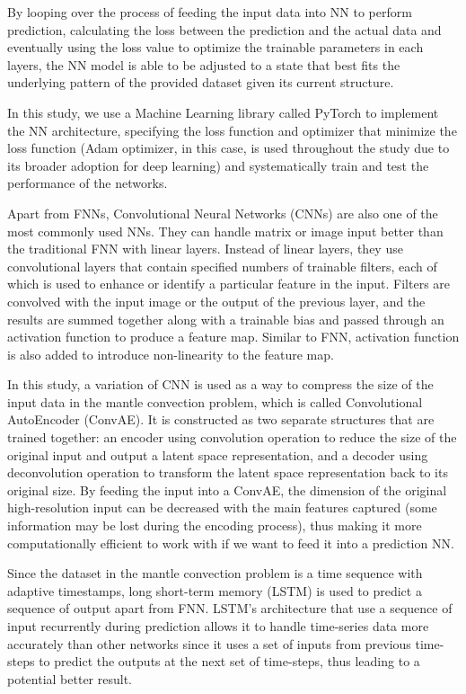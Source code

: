 By looping over the process of feeding the input data into NN to perform prediction, calculating the loss between the prediction and the actual data and eventually using the loss value to optimize the trainable parameters in each layers, the NN model is able to be adjusted to a state that best fits the underlying pattern of the provided dataset given its current structure.

In this study, we use a Machine Learning library called PyTorch to implement the NN architecture, specifying the loss function and optimizer that minimize the loss function (Adam optimizer, in this case, is used throughout the study due to its broader adoption for deep learning) and systematically train and test the performance of the networks.

Apart from FNNs, Convolutional Neural Networks (CNNs) are also one of the most commonly used NNs. They can handle matrix or image input better than the traditional FNN with linear layers. Instead of linear layers, they use convolutional layers that contain specified numbers of trainable filters, each of which is used to enhance or identify a particular feature in the input. Filters are convolved with the input image or the output of the previous layer, and the results are summed together along with a trainable bias and passed through an activation function to produce a feature map. Similar to FNN, activation function is also added to introduce non-linearity to the feature map.

In this study, a variation of CNN is used as a way to compress the size of the input data in the mantle convection problem, which is called Convolutional AutoEncoder (ConvAE). It is constructed as two separate structures that are trained together: an encoder using convolution operation to reduce the size of the original input and output a latent space representation, and a decoder using deconvolution operation to transform the latent space representation back to its original size. By feeding the input into a ConvAE, the dimension of the original high-resolution input can be decreased with the main features captured (some information may be lost during the encoding process), thus making it more computationally efficient to work with if we want to feed it into a prediction NN.

Since the dataset in the mantle convection problem is a time sequence with adaptive timestamps, long short-term memory (LSTM) is used to predict a sequence of output apart from FNN. LSTM's architecture that use a sequence of input recurrently during prediction allows it to handle time-series data more accurately than other networks since it uses a set of inputs from previous time-steps to predict the outputs at the next set of time-steps, thus leading to a potential better result.



